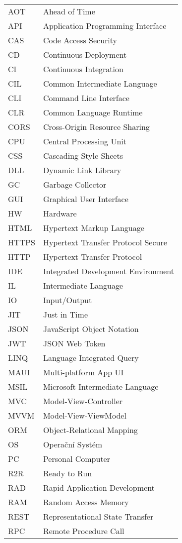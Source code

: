 
\seznamzkr

\begin{tabular}{ll}
AOT & Ahead of Time \\
API & Application Programming Interface \\
CAS & Code Access Security \\
CD & Continuous Deployment \\
CI & Continuous Integration \\
CIL & Common Intermediate Language \\
CLI & Command Line Interface \\
CLR & Common Language Runtime \\
CORS & Cross-Origin Resource Sharing \\
CPU & Central Processing Unit \\
CSS & Cascading Style Sheets \\
DLL & Dynamic Link Library \\
GC & Garbage Collector \\
GUI & Graphical User Interface \\
HW & Hardware \\
HTML & Hypertext Markup Language \\
HTTPS & Hypertext Transfer Protocol Secure \\
HTTP & Hypertext Transfer Protocol \\
IDE & Integrated Development Environment \\
IL & Intermediate Language \\
IO & Input/Output \\
JIT & Just in Time \\
JSON & JavaScript Object Notation \\
JWT & JSON Web Token \\
LINQ & Language Integrated Query \\
MAUI & Multi-platform App UI \\
MSIL & Microsoft Intermediate Language \\
MVC & Model-View-Controller \\
MVVM & Model-View-ViewModel \\
ORM & Object-Relational Mapping \\
OS & Operační Systém \\
PC & Personal Computer \\
R2R & Ready to Run \\
RAD & Rapid Application Development \\
RAM & Random Access Memory \\
REST & Representational State Transfer \\
RPC & Remote Procedure Call \\
\end{tabular}

